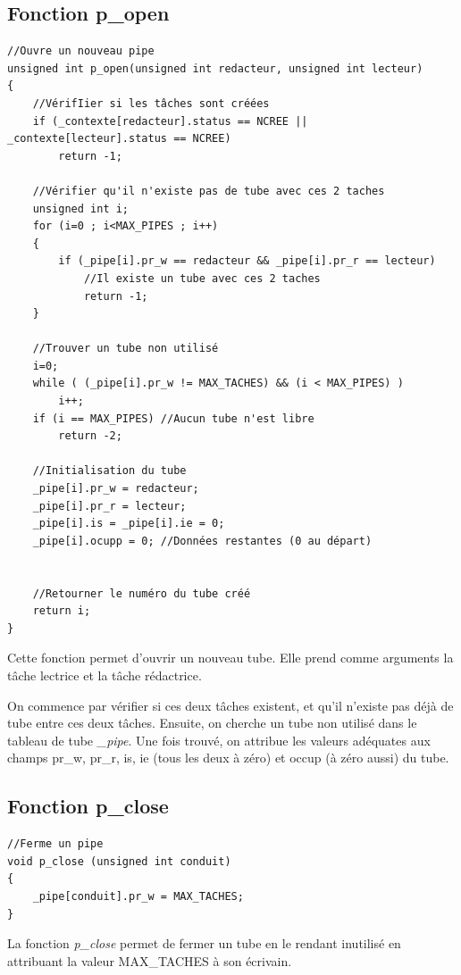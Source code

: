 \documentclass[a4paper,12pt]{report}
\begin{document}
\subsection{Fonction p\_open}
\begin{lstlisting}
//Ouvre un nouveau pipe
unsigned int p_open(unsigned int redacteur, unsigned int lecteur)
{
	//VérifIier si les tâches sont créées
	if (_contexte[redacteur].status == NCREE || _contexte[lecteur].status == NCREE)
		return -1;

	//Vérifier qu'il n'existe pas de tube avec ces 2 taches
	unsigned int i;
	for (i=0 ; i<MAX_PIPES ; i++)
	{
		if (_pipe[i].pr_w == redacteur && _pipe[i].pr_r == lecteur)
			//Il existe un tube avec ces 2 taches
			return -1;
	}

	//Trouver un tube non utilisé
	i=0;
	while ( (_pipe[i].pr_w != MAX_TACHES) && (i < MAX_PIPES) )
		i++;
	if (i == MAX_PIPES) //Aucun tube n'est libre
		return -2;

	//Initialisation du tube
	_pipe[i].pr_w = redacteur;
	_pipe[i].pr_r = lecteur;
	_pipe[i].is = _pipe[i].ie = 0;
	_pipe[i].ocupp = 0; //Données restantes (0 au départ)


	//Retourner le numéro du tube créé
	return i;
}
\end{lstlisting}

Cette fonction permet d'ouvrir un nouveau tube. Elle prend comme arguments la tâche lectrice et la tâche rédactrice. 

On commence par vérifier si ces deux tâches existent, et qu'il n'existe pas déjà de tube entre ces deux tâches. Ensuite, on cherche un tube non utilisé dans le tableau de tube \textit{\_pipe}. Une fois trouvé, on attribue les valeurs adéquates aux champs pr\_w, pr\_r, is, ie (tous les deux à zéro) et occup (à zéro aussi) du tube.


\subsection{Fonction p\_close}
\begin{lstlisting}
//Ferme un pipe
void p_close (unsigned int conduit)
{
	_pipe[conduit].pr_w = MAX_TACHES;
}
\end{lstlisting}
La fonction \textit{p\_close} permet de fermer un tube en le rendant inutilisé en attribuant la valeur MAX\_TACHES à son écrivain.
\end{document}
